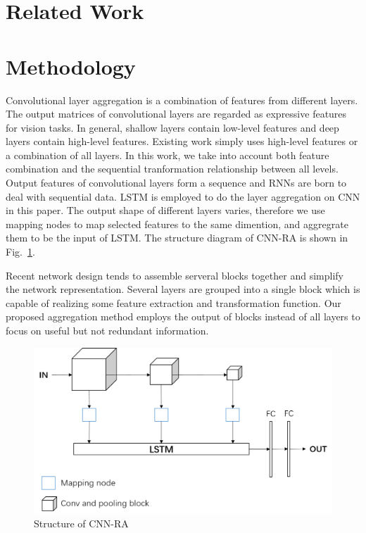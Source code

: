 \documentclass[runningheads]{llncs}
\begin{document}


\section{Related Work}

\section{Methodology}
Convolutional layer aggregation is a combination of features from different layers. The output matrices of convolutional layers are regarded as expressive features for vision tasks. In general, shallow layers contain low-level features and deep layers contain high-level features. Existing work simply uses high-level features or a combination of all layers. In this work, we take into account both feature combination and the sequential tranformation relationship between all levels. Output features of convolutional layers form a sequence and RNNs are born to deal with sequential data. LSTM is employed to do the layer aggregation on CNN in this paper. The output shape of different layers varies, therefore we use mapping nodes to map selected features to the same dimention, and aggregrate them to be the input of LSTM. The structure diagram of CNN-RA is shown in Fig.~\ref{fig:CNN-RA}.

Recent network design tends to assemble serveral blocks together and simplify the network representation. Several layers are grouped into a single block which is capable of realizing some feature extraction and transformation function. Our proposed aggregation method employs the output of blocks instead of all layers to focus on useful but not redundant information.

\begin{figure}  
	\centering
	\includegraphics[width=12cm]{Figures/CNN-RA.png}
	\caption{Structure of CNN-RA}
	\label{fig:CNN-RA}
\end{figure}
\end{document}

